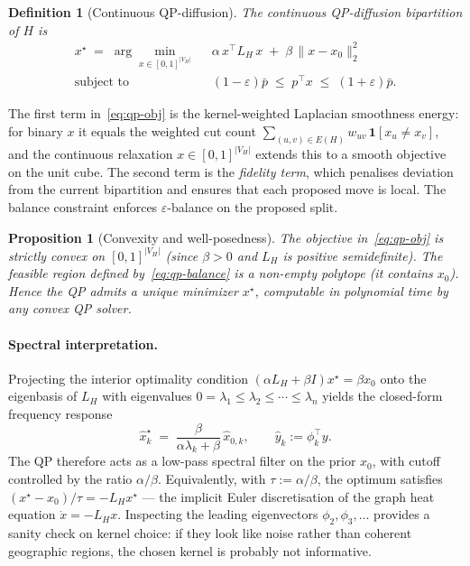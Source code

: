 \documentclass[11pt]{article}
\newtheorem{proposition}{Proposition}[section]
\newtheorem{definition}{Definition}[section]
\begin{document}
\begin{definition}[Continuous QP-diffusion]\label{def:qp}
The continuous QP-diffusion bipartition of $H$ is
\begin{align}
  x^\star \;=\; \arg\min_{x \in [0,1]^{|V_H|}} \;\;
    & \alpha\, x^\top L_H\, x \;+\; \beta\, \|x - x_0\|_2^2 \label{eq:qp-obj} \\
  \text{subject to} \;\;
    & (1 - \varepsilon) \bar p \;\le\; p^\top x \;\le\; (1 + \varepsilon) \bar p.
    \label{eq:qp-balance}
\end{align}
\end{definition}

The first term in~\eqref{eq:qp-obj} is the kernel-weighted Laplacian
smoothness energy: for binary $x$ it equals the weighted cut count
$\sum_{(u,v) \in E(H)} w_{uv}\,\mathbf{1}[x_u \ne x_v]$, and the
continuous relaxation $x \in [0,1]^{|V_H|}$ extends this to a smooth
objective on the unit cube. The second term is the \emph{fidelity term},
which penalises deviation from the current bipartition and ensures
that each proposed move is local. The balance constraint enforces
$\varepsilon$-balance on the proposed split.

\begin{proposition}[Convexity and well-posedness]\label{prop:convex}
The objective in~\eqref{eq:qp-obj} is strictly convex on
$[0,1]^{|V_H|}$ (since $\beta > 0$ and $L_H$ is positive semidefinite).
The feasible region defined by~\eqref{eq:qp-balance} is a non-empty
polytope (it contains $x_0$). Hence the QP admits a unique minimizer
$x^\star$, computable in polynomial time by any convex QP solver.
\end{proposition}

\paragraph{Spectral interpretation.} Projecting the interior optimality
condition $(\alpha L_H + \beta I) x^\star = \beta x_0$ onto the
eigenbasis of $L_H$ with eigenvalues
$0 = \lambda_1 \le \lambda_2 \le \cdots \le \lambda_n$ yields the
closed-form frequency response
\begin{equation}\label{eq:freq-response}
  \hat x^\star_k \;=\; \frac{\beta}{\alpha \lambda_k + \beta}\,
  \hat x_{0,k},
  \qquad \hat y_k := \phi_k^\top y.
\end{equation}
The QP therefore acts as a low-pass spectral filter on the prior $x_0$,
with cutoff controlled by the ratio $\alpha / \beta$. Equivalently, with
$\tau := \alpha / \beta$, the optimum satisfies
$(x^\star - x_0)/\tau = -L_H x^\star$ --- the implicit Euler
discretisation of the graph heat equation $\dot x = -L_H x$. Inspecting
the leading eigenvectors $\phi_2, \phi_3, \ldots$ provides a sanity
check on kernel choice: if they look like noise rather than coherent
geographic regions, the chosen kernel is probably not informative.
\end{document}
